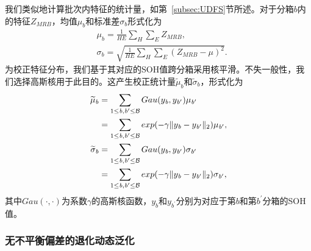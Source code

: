 \documentclass[UTF8,lettersize,journal]{IEEEtran}
\begin{document}
我们类似地计算批次内特征的统计量，如第~\ref{subsec:UDFS}节所述。对于分箱$\textit{b}$内的特征$Z_{MRB}$，均值$\mu_{\textit{b}}$和标准差$\sigma_{\textit{b}}$形式化为
\begin{align}
    & \mu_{\textit{b}} = \frac{1}{HE}\sum_{H}\sum_{E}Z_{MRB}, \\
    & \sigma_{\textit{b}} = \sqrt{\frac{1}{HE}\sum_{H}\sum_{E}(Z_{MRB} - \mu)^{2}}.
\end{align}
% 
为校正特征分布，我们基于其对应的SOH值跨分箱采用核平滑。不失一般性，我们选择高斯核用于此目的。这产生校正统计量$\widetilde{\mu}_{\textit{b}}$和$\widetilde{\sigma}_{\textit{b}}$，形式化为
\begin{align}
    \widetilde{\mu}_{\textit{b}} & = \sum_{1 \leq \textit{b}, \textit{b}^{\prime} \leq \mathcal{B}}Gau(y_{\textit{b}}, y_{\textit{b}^{\prime}})\mu_{\textit{b}^{\prime}} \notag \\
    & = \sum_{1 \leq \textit{b}, \textit{b}^{\prime} \leq \mathcal{B}}exp(-\gamma\|y_{\textit{b}} - y_{\textit{b}^{\prime}}\|_{2})\mu_{\textit{b}^{\prime}},\label{mu_calibration} \\
    \widetilde{\sigma}_{\textit{b}} & = \sum_{1 \leq \textit{b}, \textit{b}^{\prime} \leq \mathcal{B}}Gau(y_{\textit{b}}, y_{\textit{b}^{\prime}})\sigma_{\textit{b}^{\prime}} \notag \\
    & = \sum_{1 \leq \textit{b}, \textit{b}^{\prime} \leq \mathcal{B}}exp(-\gamma\|y_{\textit{b}} - y_{\textit{b}^{\prime}}\|_{2})\sigma_{\textit{b}^{\prime}},\label{sigma_calibration}
\end{align}
其中$Gau(\cdot, \cdot)$为系数$\gamma$的高斯核函数，$y_{\textit{b}}$和$y_{\textit{b}^{\prime}}$分别为对应于第$\textit{b}$和第$\textit{b}^{\prime}$分箱的SOH值。

\subsubsection{无不平衡偏差的退化动态泛化}
\end{document}
